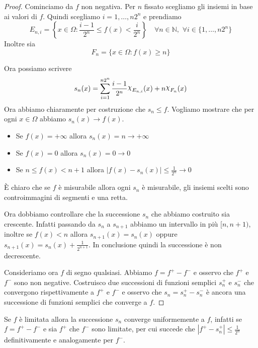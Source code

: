 \begin{proof}
    Cominciamo da \(f\) non negativa. Per \(n\) fissato scegliamo gli insiemi in
    base ai valori di \(f\). Quindi scegliamo \(i = 1, \dots, n2^{n}\) e
    prendiamo \[E_{n, i} = \left\{x \in \Omega : \frac{i-1}{2^{n}} \le f(x) <
    \frac{i}{2^{n}}\right\} \quad \forall n \in \mathbb{N}, \,\, \forall i \in \{1,
\dots, n2^{n}\}  \] 
Inoltre sia \[ F_{n}=\{x \in \Omega : f(x) \ge n\} \]

    Ora possiamo scrivere
    \[
        s_{n}(x) = \sum_{i=1}^{n{2}^{n}} \frac{i-1}{2^{n}} \rchi_{E_{n, i}}(x) +
        n \rchi_{F_{n}}(x)
    \]
    Ora abbiamo chiaramente per costruzione che \(s_{n} \le f\). Vogliamo
    mostrare che per ogni \(x \in \Omega\) abbiamo \(s_{n}(x) \to f(x)\).
\begin{itemize}[label = --]
    \item Se \(f(x) = +\infty\) allora \(s_{n}(x) = n \to +\infty\)
    \item Se \(f(x) = 0\) allora \(s_{n}(x) = 0 \to 0\)
    \item Se \(n \le f(x) < n+1\) allora \(|f(x) - s_{n}(x)| \le \frac{1}{2^{n}}
        \to 0\) 
\end{itemize}

È chiaro che se \(f\) è misurabile allora ogni \(s_{n}\) è misurabile, gli insiemi scelti sono controimmagini di segmenti e una retta.

Ora dobbiamo controllare che la successione \(s_{n}\) che abbiamo costruito sia
crescente. Infatti passando da \(s_{n}\) a \(s_{n+1}\) abbiamo un intervallo in
più \([n, n+1)\), inoltre se \(f(x) < n\) allora \(s_{n+1}(x) = s_{n}(x)\)
oppure \(s_{n+1}(x) = s_{n}(x) + \frac{1}{2^{n+1}}\). In conclusione quindi la
successione è non decrescente.

Consideriamo ora \(f\) di segno qualsiasi. Abbiamo \(f = f^{+} - f^{-}\) e
osservo che \(f^{+}\) e \(f^{-}\) sono non negative. Costruisco due successioni
di funzioni semplici \(s_{n}^{+}\) e \(s_{n}^{-}\) che convergono
rispettivamente a \(f^{+}\) e \(f^{-}\) e osservo che \(s_{n} = s_{n}^{+} -
s_{n}^{-}\) è ancora una successione di funzioni semplici che converge a \(f\).
\end{proof}
\begin{remark}
    Se \(f\) è limitata allora la successione \(s_{n}\) converge uniformemente a
    \(f\), infatti se \(f = f^{+} - f^{-}\) e sia \(f^{+}\) che \(f^{-}\) sono
    limitate, per cui succede che \(|f^{+} - s_{n}^{+}| \le \frac{1}{2^{n}}\)
    definitivamente e analogamente per \(f^{-}\).
\end{remark}

